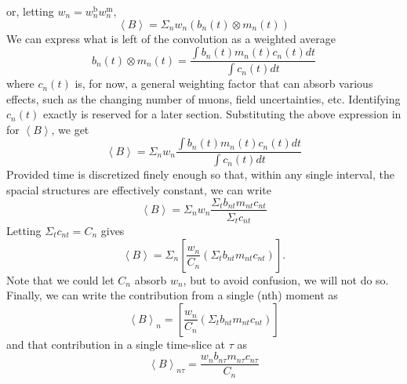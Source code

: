 \documentclass[twoside]{article}
\begin{document}
\begin{multicols}{2}
or, letting $w_n = w^{\text{b}}_n w^{\text{m}}_n$,
\begin{equation}
\left\langle B \right\rangle =  \Sigma_n w_n (b_{n}(t) \otimes m_{n}(t))
\end{equation}
We can express what is left of the convolution as a weighted average
\begin{equation}
b_{n}(t) \otimes m_{n}(t) = 
\frac{ \int b_{n}(t) m_{n}(t) c_n(t) dt}{\int c_n(t) dt}
\end{equation}
where $c_n(t)$ is, for now, a general weighting factor that can absorb various effects, such as the changing number of muons, field uncertainties, etc. Identifying $c_n(t)$ exactly is reserved for a later section. Substituting the above expression in for $\left\langle B \right\rangle$, we get
\begin{equation}
\left\langle B \right\rangle =
 \Sigma_n w_n \frac{ \int b_{n}(t) m_{n}(t) c_n(t) dt}{\int c_n(t) dt}
\end{equation}
Provided time is discretized finely enough so that, within any single interval, the spacial structures are effectively constant, we can write
\begin{equation}
	\left\langle B \right\rangle = 
	\Sigma_{n} w_n \frac{\Sigma_{t} b_{nt} m_{nt} c_{nt}}{\Sigma_t c_{nt}}
\end{equation}
Letting $\Sigma_{t} c_{nt} = C_n $ gives
\begin{equation}
\boxed{
\left\langle B \right\rangle =
\Sigma_{n}[ \frac{w_n}{C_n} (\Sigma_{t} b_{nt} m_{nt} c_{nt})].
}
\end{equation}
Note that  we could let $C_n$ absorb $w_n$, but to avoid confusion, we will not do so. Finally, we can write the contribution from a single (nth) moment as
\begin{equation}
\boxed{
	\left\langle B \right\rangle_n =
	[ \frac{w_n}{C_n} (\Sigma_{t} b_{nt} m_{nt} c_{nt})]
}
\end{equation}
and that contribution in a single time-slice at $\tau$ as 
\begin{equation}
\boxed{
		\left\langle B \right\rangle_{n\tau} =
		 \frac{w_n b_{n\tau} m_{n\tau} c_{n\tau}}{C_n}
}
\end{equation}


\end{multicols}
\newpage
\end{document}
